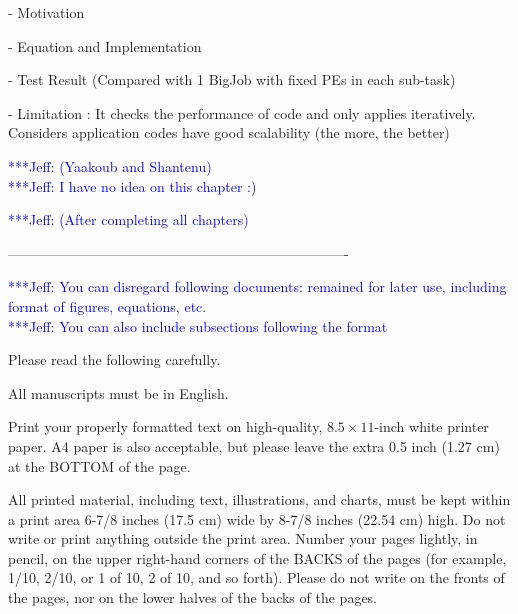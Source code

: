 \documentclass[times, 10pt,twocolumn]{article}
\newcommand{\skonote}[1]{ {\textcolor{blue} { ***Jeff: #1 }}}
\newcommand{\skonote}[1]{}
\begin{document}
- Motivation

- Equation and Implementation

- Test Result (Compared with 1 BigJob with fixed PEs in each sub-task)

- Limitation
: It checks the performance of code and only applies iteratively. Considers application codes have good scalability (the more, the better)


\skonote{(Yaakoub and Shantenu)}\\
\skonote{I have no idea on this chapter :)}


\skonote{(After completing all chapters)}


------------------------------------------------------------------------- 


\skonote{You can disregard following documents: remained for later use, including format of figures, equations, etc.}\\
\skonote{You can also include subsections following the format}





Please read the following carefully.


All manuscripts must be in English.


Print your properly formatted text on high-quality, $8.5 \times 11$-inch 
white printer paper. A4 paper is also acceptable, but please leave the 
extra 0.5 inch (1.27 cm) at the BOTTOM of the page.


All printed material, including text, illustrations, and charts, must be 
kept within a print area 6-7/8 inches (17.5 cm) wide by 8-7/8 inches 
(22.54 cm) high. Do not write or print anything outside the print area. 
Number your pages lightly, in pencil, on the upper right-hand corners of 
the BACKS of the pages (for example, 1/10, 2/10, or 1 of 10, 2 of 10, and 
so forth). Please do not write on the fronts of the pages, nor on the 
lower halves of the backs of the pages.
\end{document}
